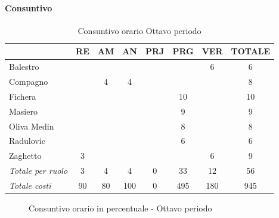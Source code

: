 \documentclass[a4paper,12pt]{article}
\begin{document}
            \paragraph{Consuntivo}
                \begin{table}[H]
                \centering
                \caption{Consuntivo orario Ottavo periodo}
                \begin{tabular}{|l|c|c|c|c|c|c|c|}
                \hline
                    \rowcolor{lightgray}{\textbf{Membro}} & {\textbf{RE}} & {\textbf{AM}} & {\textbf{AN}} & {\textbf{PRJ}} & {\textbf{PRG}} & {\textbf{VER}} & {\textbf{TOTALE}}\\
                \hline
                    Balestro & & & & & & 6 & 6\\
                \hline
                    Compagno & & 4 & 4 & & & & 8\\
                \hline
                    Fichera & & & & & 10 & & 10\\
                \hline
                    Masiero & & & & & 9 & & 9\\
                \hline
                    Oliva Medin & & & & & 8 & & 8\\
                \hline
                    Radulovic & & & & & 6 & & 6\\
                \hline
                    Zaghetto & 3 & & & & & 6 & 9\\
                \hline
                    \rowcolor{lightgray}\textit{Totale per ruolo} & 3 & 4 & 4 & 0 & 33 & 12 & 56\\
                \hline
                    \rowcolor{lightgray}\textit{Totale costi} & 90 & 80 & 100 & 0 & 495 & 180 & 945\\
                \hline
                \end{tabular}
                \end{table}

                \begin{figure}[H]
                \centering
                \caption{Consuntivo orario in percentuale - Ottavo periodo}
                \end{figure}
                
\end{document}
